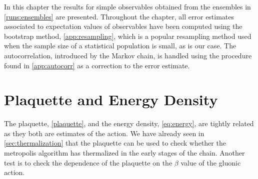 In this chapter the results for simple observables obtained from the ensembles in \cref{runs:ensembles} are presented. Throughout the chapter, all error estimates associated to expectation values of observables have been computed using the bootstrap method, \cref{app:resampling}, which is a popular resampling method used when the sample size of a statistical population is small, as is our case. The autocorrelation, introduced by the Markov chain, is handled using the procedure found in \cref{app:autocorr} as a correction to the error estimate.

\section{Plaquette and Energy Density} 
The plaquette, \cref{plaquette}, and the energy density, \cref{eq:energy}, are tightly related as they both are estimates of the action. We have already seen in \cref{sec:thermalization} that the plaquette can be used to check whether the metropolis algorithm has thermalized in the early stages of the chain. Another test is to check the dependence of the plaquette on the $\beta$ value of the gluonic action.

